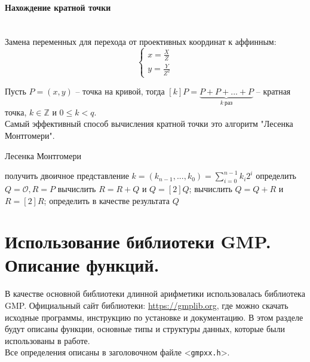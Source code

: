 \documentclass[a4paper,12pt]{article}
\begin{document}
	\paragraph*{Нахождение кратной точки}
	\noindent\\
	
	Замена переменных для перехода от проективных координат к аффинным: 
	\begin{equation*}\label{key}
		\begin{cases}
			x=\frac{X}{Z}\\
			y=\frac{Y}{Z^2}
		\end{cases}
	\end{equation*}

	Пусть $P=(x, y)$ -- точка на кривой, тогда $[k]P=\underbrace{P+P+...+P}_{k\: \text{раз}}$ -- кратная точка, $k\in\mathbb{Z}$ и $0\leq k<q$.\\
	
	Самый эффективный способ вычисления кратной точки это алгоритм "Лесенка Монтгомери".
	\begin{algorithm}
		\caption{Лесенка Монтгомери}\label{alg:Example}
		\begin{algorithmic}[1]
			
			\State получить двоичное представление $k=(k_{n-1}, ..., k_0)=\sum_{i=0}^{n-1}k_i2^i$
			\State определить $Q = \mathcal{O}, R=P$
					\State вычислить $R=R+Q$ и $Q=[2]Q$;
				\EndIf
					\State вычислить $Q=Q+R$ и $R=[2]R$;
				\EndIf
			\EndFor
			\State определить в качестве результата $Q$
			
		\end{algorithmic}
	\end{algorithm}
	\newpage
	
	\section{Использование библиотеки GMP. Описание функций.}
	В качестве основной библиотеки длинной арифметики использовалась библиотека GMP. Официальный сайт библиотеки: \href{https://gmplib.org}{https://gmplib.org}, где можно скачать исходные программы, инструкцию по установке и документацию. В этом разделе будут описаны функции, основные типы и структуры данных, которые были использованы в работе.\\
	
	Все определения описаны в заголовочном файле <\texttt{gmpxx.h}>.\\
	
\end{document}
